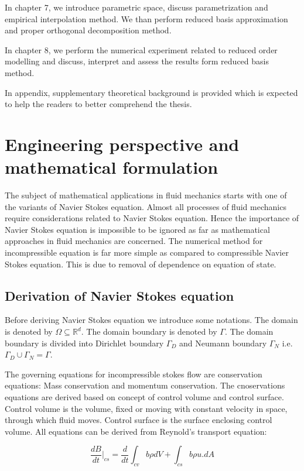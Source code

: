 \documentclass[a4paper,10pt]{book}
\begin{document}
In chapter 7, we introduce parametric space, discuss parametrization and empirical interpolation method. We than perform reduced basis approximation and proper orthogonal decomposition method. 

In chapter 8, we perform the numerical experiment related to reduced order modelling and discuss, interpret and assess the results form reduced basis method.

In appendix, supplementary theoretical background is provided which is expected to help the readers to better comprehend the thesis.

\newpage


\chapter{Engineering perspective and mathematical formulation} 

The subject of mathematical applications in fluid mechanics starts with  one of the variants of Navier Stokes equation. Almost all processes of fluid mechanics require considerations related to Navier Stokes equation. Hence the importance of Navier Stokes equation is impossible to be ignored as far as mathematical approaches in fluid mechanics are concerned. The numerical method for incompressible equation is far more simple as compared to compressible Navier Stokes equation. This is due to removal of dependence on equation of state. 

\section{Derivation of Navier Stokes equation}

Before deriving Navier Stokes equation we introduce some notations. The domain is denoted by $\Omega \subseteq \mathbb{R}^d $. The domain boundary is denoted by $\Gamma$. The domain boundary is divided into Dirichlet boundary $\Gamma_D$ and Neumann boundary $\Gamma_N$ i.e. $\Gamma_D \cup \Gamma_N = \Gamma $. 

The governing equations for incompressible stokes flow are conservation equations: Mass conservation and momentum conservation. The cnoservations equations are derived based on concept of control volume and control surface. Control volume is the volume, fixed or moving with constant velocity in space, through which fluid moves. Control surface is the surface enclosing control volume. All equations can be derived from Reynold's transport equation:


\begin{equation} \label{rtt} 
\frac{dB}{dt}|_{cs} = \frac{d}{dt} \int_{cv} b \rho dV + \int_{cs} b \rho u.dA 
\end{equation}
\end{document}
